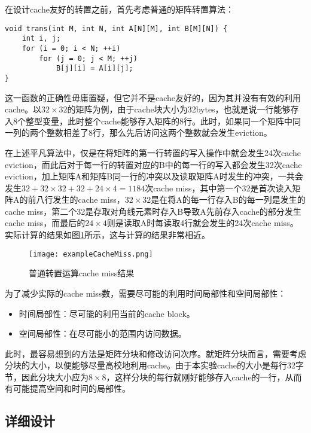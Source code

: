 \par 在设计cache友好的转置之前，首先考虑普通的矩阵转置算法：
\begin{lstlisting}
void trans(int M, int N, int A[N][M], int B[M][N]) {
    int i, j;
    for (i = 0; i < N; ++i)
        for (j = 0; j < M; ++j)
            B[j][i] = A[i][j];
}
\end{lstlisting}
\par 这一函数的正确性毋庸置疑，但它并不是cache友好的，因为其并没有有效的利用cache。以$32\times 32$的矩阵为例，由于cache块大小为32bytes，也就是说一行能够存入8个整型变量，此时整个cache能够存入矩阵的8行。此时，如果同一个矩阵中同一列的两个整数相差了8行，那么先后访问这两个整数就会发生eviction。

\par 在上述平凡算法中，仅是在将矩阵的第一行转置的写入操作中就会发生24次cache eviction，而此后对于每一行的转置对应的B中的每一行的写入都会发生32次cache eviction，加上矩阵A和矩阵B同一行的冲突以及读取矩阵A时发生的冲突，一共会发生$32 + 32\times 32 + 32 + 24\times 4 = 1184$次cache miss，其中第一个32是首次读入矩阵A的前八行发生的cache miss，$32\times 32$是在将A的每一行存入B的每一列是发生的cache miss，第二个32是存取对角线元素时存入B导致A先前存入cache的部分发生cache miss，而最后的$24\times 4$则是读取A时每读取4行就会发生的24次cache miss。实际计算的结果如图\ref{fig:exampleCacheMiss}所示，这与计算的结果非常相近。

\begin{figure}[htb]
    \centering
    \texttt{[image: exampleCacheMiss.png]}
    \caption{普通转置运算cache miss结果}
    \label{fig:exampleCacheMiss}
\end{figure}

\par 为了减少实际的cache miss数，需要尽可能的利用时间局部性和空间局部性：
\begin{itemize}
    \item 时间局部性：尽可能的利用当前的cache block。
    \item 空间局部性：在尽可能小的范围内访问数据。
\end{itemize}
\par 此时，最容易想到的方法是矩阵分块和修改访问次序。就矩阵分块而言，需要考虑分块的大小，以便能够尽量高校地利用cache。由于本实验cache的大小是每行32字节，因此分块大小应为$8\times 8$，这样分块的每行就刚好能够存入cache的一行，从而有可能提高空间和时间的局部性。

\subsection{详细设计}
\label{sub2:xiang_xi_she_ji_}


